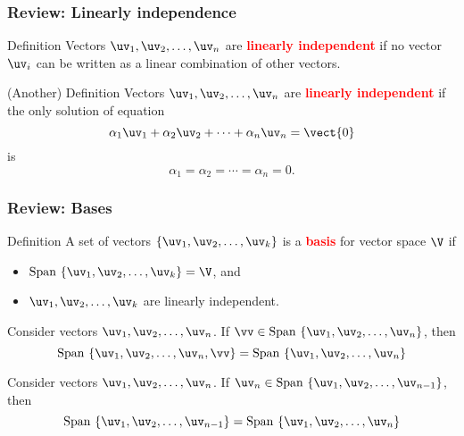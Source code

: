 \begin{frame}
  \frametitle{Review: Linearly independence}

  \begin{block}{Definition}
    Vectors $\uv_1,\uv_2,\ldots,\uv_n$ are \textcolor{red}{\bf
      linearly independent} if no vector $\uv_i$ can be written as a
    linear combination of other vectors.
  \end{block}

  \begin{block}{(Another) Definition}
    Vectors $\uv_1,\uv_2,\ldots,\uv_n$ are \textcolor{red}{\bf
      linearly independent} if the only solution of equation
    \[
    \alpha_1\uv_1 + \alpha_2\uv_2 +\cdots+\alpha_n\uv_n = \vect{0}
    \]
    is
    \[
    \alpha_1=\alpha_2=\cdots=\alpha_n=0.
    \]
  \end{block}

\end{frame}
\begin{frame}
  \frametitle{Review: Bases}

  \begin{block}{Definition}
    A set of vectors $\{\uv_1,\uv_2,\ldots,\uv_k\}$ is a \textcolor{red}{\bf basis} for vector space $\V$ if
    \begin{itemize}
    \item $\mathrm{Span}~\{\uv_1,\uv_2,\ldots,\uv_k\} = \V$, and
    \item $\uv_1,\uv_2,\ldots,\uv_k$ are linearly independent.
    \end{itemize}
  \end{block}
\end{frame}

\begin{frame}
  \begin{lemma}
    Consider vectors $\uv_1,\uv_2,\ldots,\uv_n$.
    If $\vv\in \mathrm{Span}\ \{\uv_1,\uv_2,\ldots,\uv_n\}$, then
    \[
    \mathrm{Span}\ \{\uv_1,\uv_2,\ldots,\uv_n,\vv\}
    =
    \mathrm{Span}\ \{\uv_1,\uv_2,\ldots,\uv_n\}
    \]
    \label{lemma:sup-vect}
  \end{lemma}
  \pause
  \begin{lemma}
    Consider vectors $\uv_1,\uv_2,\ldots,\uv_n$.
    If $\uv_n\in \mathrm{Span}\ \{\uv_1,\uv_2,\ldots,\uv_{n-1}\}$, then
    \[
    \mathrm{Span}\ \{\uv_1,\uv_2,\ldots,\uv_{n-1}\}
    =
    \mathrm{Span}\ \{\uv_1,\uv_2,\ldots,\uv_n\}
    \]
  \end{lemma}
\end{frame}

